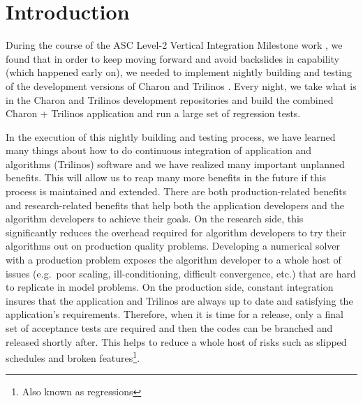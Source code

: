 \documentclass[pdf,ps2pdf,11pt]{SANDreport}
\begin{document}

%

\SANDmain %

%
\section{Introduction}
%

During the course of the ASC Level-2 Vertical Integration Milestone work
{}\cite{ref:asc-vertical-integration-milestone}, we found that in order to
keep moving forward and avoid backslides in capability (which happened early
on), we needed to implement nightly building and testing of the development
versions of Charon and Trilinos {}\cite{ref:trilinos}.  Every night, we take
what is in the Charon and Trilinos development repositories and build the
combined Charon + Trilinos application and run a large set of regression
tests.

In the execution of this nightly building and testing process, we have learned
many things about how to do continuous integration
{}\cite{continuous-integration} of application and algorithms (Trilinos)
software and we have realized many important unplanned benefits.  This will
allow us to reap many more benefits in the future if this process is
maintained and extended.  There are both production-related benefits and
research-related benefits that help both the application developers and the
algorithm developers to achieve their goals.  On the research side, this
significantly reduces the overhead required for algorithm developers to try
their algorithms out on production quality problems.  Developing a numerical
solver with a production problem exposes the algorithm developer to a whole
host of issues (e.g.\ poor scaling, ill-conditioning, difficult convergence,
etc.) that are hard to replicate in model problems.  On the production side,
constant integration insures that the application and Trilinos are always up
to date and satisfying the application's requirements.  Therefore, when it is
time for a release, only a final set of acceptance tests are required and then
the codes can be branched and released shortly after.  This helps to reduce a
whole host of risks such as slipped schedules and broken
features\footnote{Also known as regressions}.
\end{document}
